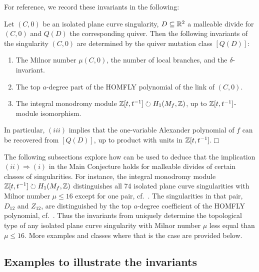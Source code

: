 For reference, we record these invariants in the following:

\begin{corollary}\label{cor:invariants_from_mutation_classes} Let $(C,0)$ be an isolated plane curve singularity, $D\subseteq\mathbb R^2$ a malleable divide for $(C,0)$ and $Q(D)$ the corresponding quiver. Then the following invariants of the singularity $(C,0)$ are determined by the quiver mutation class $[Q(D)]$:

\begin{enumerate}[label=$(\roman*)$]
    \item The Milnor number $\mu(C,0)$, the number of local branches, and the $\delta$-invariant.
    \item The top $a$-degree part of the HOMFLY polynomial of the link of $(C,0)$.
    \item The integral monodromy module $\mathbb Z[t,t^{-1}]\circlearrowright H_1(M_f,\mathbb Z)$, up to $\mathbb Z[t,t^{-1}]$-module isomorphism.
\end{enumerate}
In particular, $(iii)$ implies that the one-variable Alexander polynomial of $f$ can be recovered from $[Q(D)]$, up to product with units in $\mathbb Z[t,t^{-1}]$.\hfill$\Box$
\end{corollary}

The following subsections explore how  can be used to deduce that the implication $(ii)\Longrightarrow(i)$ in the Main Conjecture holds for malleable divides of certain classes of singularities. For instance, the integral monodromy module $\mathbb Z[t,t^{-1}]\circlearrowright H_1(M_f,\mathbb Z)$ distinguishes all 74 isolated plane curve singularities with Milnor number $\mu\leq 16$ except for one pair, cf.~. The singularities in that pair, $D_{12}$ and $Z_{12}$, are distinguished by the top $a$-degree coefficient of the HOMFLY polynomial, cf.~. Thus the invariants from  uniquely determine the topological type of any isolated plane curve singularity with Milnor number $\mu$ less equal than $\mu\leq 16$. More examples and classes where that is the case are provided below.

\subsection{Examples to illustrate the invariants}\label{ssec:AlexanderPoly_Singularities}

